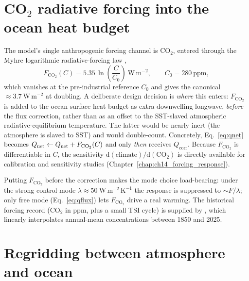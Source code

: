 \section{CO$_2$ radiative forcing into the ocean heat budget}\label{sec:co2}

The model's single anthropogenic forcing channel is CO$_2$, entered through the
Myhre logarithmic radiative-forcing law \citep{myhre1998},
\begin{equation}
  F_{\mathrm{CO_2}}(C) = 5.35\,\ln\!\left(\frac{C}{C_0}\right)\ \mathrm{W\,m^{-2}},
  \qquad C_0 = 280\ \mathrm{ppm},
  \label{eq:myhre}
\end{equation}
which vanishes at the pre-industrial reference $C_0$ and gives the canonical
$\approx3.7\ \mathrm{W\,m^{-2}}$ at doubling. A deliberate design decision is
\emph{where} this enters: $F_{\mathrm{CO_2}}$ is added to the ocean surface heat
budget as extra downwelling longwave, \emph{before} the flux correction, rather
than as an offset to the SST-slaved atmospheric radiative-equilibrium temperature.
The latter would be nearly inert (the atmosphere is slaved to SST) and would
double-count. Concretely, Eq.~\eqref{eq:qnet} becomes
$Q_{\mathrm{net}} \leftarrow Q_{\mathrm{net}} + F_{\mathrm{CO_2}}(C)$ and only \emph{then} receives
$Q_{\mathrm{corr}}$. Because $F_{\mathrm{CO_2}}$ is differentiable in $C$, the
sensitivity $\mathrm{d}(\text{climate})/\mathrm{d}(\mathrm{CO_2})$ is directly
available for calibration and sensitivity studies (Chapter~\ref{chap:ch14_forcing_response}).

\begin{remark}
Putting $F_{\mathrm{CO_2}}$ before the correction makes the mode choice
load-bearing: under the strong control-mode $\lambda\approx50\ \mathrm{W\,m^{-2}\,K^{-1}}$
the response is suppressed to $\sim\!F/\lambda$; only free mode
(Eq.~\eqref{eq:qflux}) lets $F_{\mathrm{CO_2}}$ drive a real warming. The
historical forcing record (CO$_2$ in ppm, plus a small TSI cycle) is supplied by
, which linearly interpolates annual-mean concentrations
between 1850 and 2025. 
\end{remark}

\section{Regridding between atmosphere and ocean}

